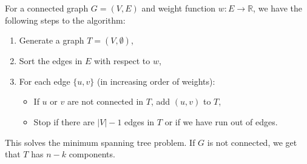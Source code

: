 For a connected graph $G = (V, E)$ and weight function 
$w : E \to \mathbb{R}$, we have the following steps to the algorithm: 
\begin{enumerate}
  \item Generate a graph $T = (V, \emptyset)$,
  \item Sort the edges in $E$ with respect to $w$,
  \item For each edge $\{u, v\}$ (in increasing order of weights): \begin{itemize}
    \item If $u$ or $v$ are not connected in $T$, add $(u, v)$ to $T$,
    \item Stop if there are $|V| - 1$ edges in $T$ or if we have run
    out of edges.
  \end{itemize}
\end{enumerate} This solves the minimum spanning tree problem.
If $G$ is not connected, we get that $T$ has $n - k$ components.
